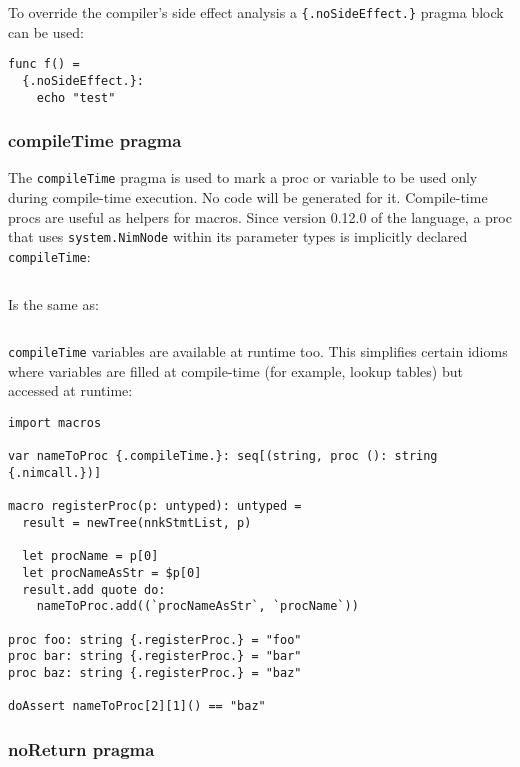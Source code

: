 To override the compiler's side effect analysis a
\texttt{\{.noSideEffect.\}} pragma block can be used:

\begin{verbatim}
func f() =
  {.noSideEffect.}:
    echo "test"
\end{verbatim}

\hypertarget{compiletime-pragma}{%
\subsubsection{compileTime pragma}\label{compiletime-pragma}}

The \texttt{compileTime} pragma is used to mark a proc or variable to be
used only during compile-time execution. No code will be generated for
it. Compile-time procs are useful as helpers for macros. Since version
0.12.0 of the language, a proc that uses \texttt{system.NimNode} within
its parameter types is implicitly declared \texttt{compileTime}:

\begin{verbatim}
\end{verbatim}

Is the same as:

\begin{verbatim}
\end{verbatim}

\texttt{compileTime} variables are available at runtime too. This
simplifies certain idioms where variables are filled at compile-time
(for example, lookup tables) but accessed at runtime:

\begin{verbatim}
import macros

var nameToProc {.compileTime.}: seq[(string, proc (): string {.nimcall.})]

macro registerProc(p: untyped): untyped =
  result = newTree(nnkStmtList, p)

  let procName = p[0]
  let procNameAsStr = $p[0]
  result.add quote do:
    nameToProc.add((`procNameAsStr`, `procName`))

proc foo: string {.registerProc.} = "foo"
proc bar: string {.registerProc.} = "bar"
proc baz: string {.registerProc.} = "baz"

doAssert nameToProc[2][1]() == "baz"
\end{verbatim}

\hypertarget{noreturn-pragma}{%
\subsubsection{noReturn pragma}\label{noreturn-pragma}}

